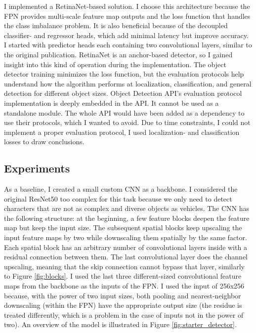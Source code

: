 I implemented a RetinaNet-based solution. I choose this architecture because the FPN provides multi-scale feature map outputs and the loss function that handles the class imbalance problem. It is also beneficial because of the decoupled classifier- and regressor heads, which add minimal latency but improve accuracy. I started with predictor heads each containing two convolutional layers, similar to the original publication. RetinaNet is an anchor-based detector, so I gained insight into this kind of operation during the implementation. The object detector training minimizes the loss function, but the evaluation protocols help understand how the algorithm performs at localization, classification, and general detection for different object sizes. Object Detection API's evaluation protocol implementation is deeply embedded in the API. It cannot be used as a standalone module. The whole API would have been added as a dependency to use their protocols, which I wanted to avoid. Due to time constraints, I could not implement a proper evaluation protocol, I used localization- and classification losses to draw conclusions.

\subsection{Experiments}

As a baseline, I created a small custom CNN as a backbone. I considered the original ResNet50 too complex for this task because we only need to detect characters that are not as complex and diverse objects as vehicles. The CNN has the following structure: at the beginning, a few feature blocks deepen the feature map but keep the input size. The subsequent spatial blocks keep upscaling the input feature maps by two while downscaling them spatially by the same factor. Each spatial block has an arbitrary number of convolutional layers inside with a residual connection between them. The last convolutional layer does the channel upscaling, meaning that the skip connection cannot bypass that layer, similarly to Figure \ref{fig:blocks}. I used the last three different-sized convolutional feature maps from the backbone as the inputs of the FPN. I used the input of 256x256 because, with the power of two input sizes, both pooling and nearest-neighbor downscaling (within the FPN) have the appropriate output size (the residue is treated differently, which is a problem in the case of inputs not in the power of two). An overview of the model is illustrated in Figure \ref{fig:starter_detector}.

